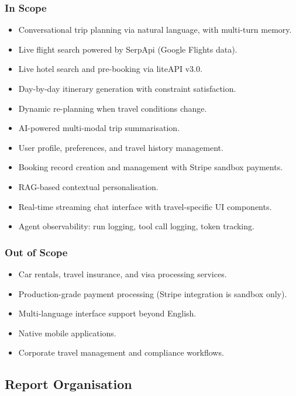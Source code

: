 \documentclass[12pt, a4paper]{article}
\begin{document}
\subsubsection{In Scope}
\begin{itemize}[leftmargin=1.5cm, itemsep=0.3em]
  \item Conversational trip planning via natural language, with multi-turn memory.
  \item Live flight search powered by SerpApi (Google Flights data).
  \item Live hotel search and pre-booking via liteAPI v3.0.
  \item Day-by-day itinerary generation with constraint satisfaction.
  \item Dynamic re-planning when travel conditions change.
  \item AI-powered multi-modal trip summarisation.
  \item User profile, preferences, and travel history management.
  \item Booking record creation and management with Stripe sandbox payments.
  \item RAG-based contextual personalisation.
  \item Real-time streaming chat interface with travel-specific UI components.
  \item Agent observability: run logging, tool call logging, token tracking.
\end{itemize}

\subsubsection{Out of Scope}
\begin{itemize}[leftmargin=1.5cm, itemsep=0.3em]
  \item Car rentals, travel insurance, and visa processing services.
  \item Production-grade payment processing (Stripe integration is sandbox only).
  \item Multi-language interface support beyond English.
  \item Native mobile applications.
  \item Corporate travel management and compliance workflows.
\end{itemize}

\subsection{Report Organisation}
\end{document}
